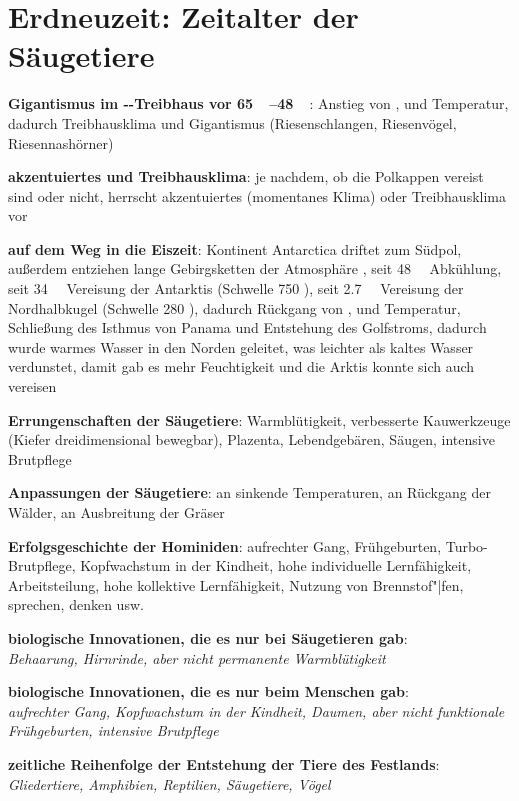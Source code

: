 \pagebreak

\section{%
    Erdneuzeit: Zeitalter der Säugetiere%
}

\textbf{Gigantismus im --Treibhaus vor \SIrange{65}{48}{\mega\year}}:
Anstieg von ,  und Temperatur,
dadurch Treibhausklima und Gigantismus
(Riesenschlangen, Riesenvögel, Riesennashörner)

\textbf{akzentuiertes und Treibhausklima}:
je nachdem, ob die Polkappen vereist sind oder nicht,
herrscht akzentuiertes (momentanes Klima) oder Treibhausklima vor

\textbf{auf dem Weg in die Eiszeit}:
Kontinent Antarctica driftet zum Südpol,
außerdem entziehen lange Gebirgsketten der Atmosphäre ,
seit \SI{48}{\mega\year} Abkühlung,
seit \SI{34}{\mega\year} Vereisung der Antarktis (Schwelle \SI{750}{\ppm} ),
seit \SI{2.7}{\mega\year} Vereisung der Nordhalbkugel (Schwelle \SI{280}{\ppm} ),
dadurch Rückgang von ,  und Temperatur,
Schließung des Isthmus von Panama und Entstehung des Golfstroms,
dadurch wurde warmes Wasser in den Norden geleitet, was leichter als kaltes Wasser verdunstet,
damit gab es mehr Feuchtigkeit und die Arktis konnte sich auch vereisen

\textbf{Errungenschaften der Säugetiere}:
Warmblütigkeit,
verbesserte Kauwerkzeuge (Kiefer dreidimensional bewegbar),
Plazenta,
Lebendgebären,
Säugen,
intensive Brutpflege

\textbf{Anpassungen der Säugetiere}:
an sinkende Temperaturen,
an Rückgang der Wälder,
an Ausbreitung der Gräser

\textbf{Erfolgsgeschichte der Hominiden}:
aufrechter Gang, Frühgeburten, Turbo-Brutpflege,
Kopfwachstum in der Kindheit, hohe individuelle Lernfähigkeit,
Arbeitsteilung, hohe kollektive Lernfähigkeit, Nutzung von Brennstof"|fen,
sprechen, denken usw.

\begin{wichtig}
    \item
    \textbf{biologische Innovationen, die es nur bei Säugetieren gab}:\\
    \emph{Behaarung, Hirnrinde, aber nicht permanente Warmblütigkeit}

    \item
    \textbf{biologische Innovationen, die es nur beim Menschen gab}:\\
    \emph{aufrechter Gang, Kopfwachstum in der Kindheit, Daumen,
    aber nicht funktionale Frühgeburten, intensive Brutpflege}

    \item
    \textbf{zeitliche Reihenfolge der Entstehung der Tiere des Festlands}:\\
    \emph{Gliedertiere, Amphibien, Reptilien, Säugetiere, Vögel}
\end{wichtig}

